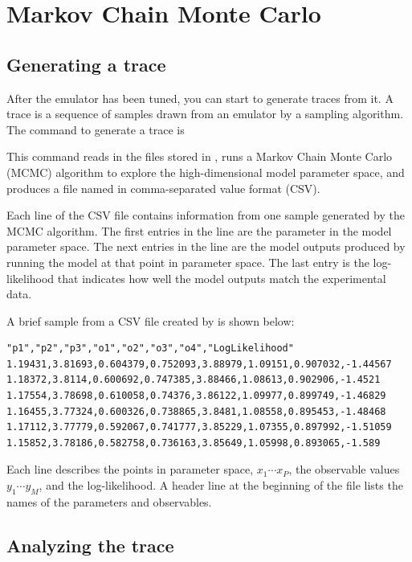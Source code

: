 \section{Markov Chain Monte Carlo}\label{sec:mcmc}

\subsection{Generating a trace}\label{subsec:GeneratingTheTrace}

After the emulator has been tuned, you can start to generate traces from it. A trace is a sequence of samples drawn from an emulator by a sampling algorithm. The command to generate a trace is


This command reads in the files stored in , runs a Markov Chain Monte Carlo (MCMC) algorithm to explore the high-dimensional model parameter space, and produces a file named  in comma-separated value format (CSV).

Each line of the CSV file contains information from one sample generated by the MCMC algorithm. The first entries in the line are the parameter in the model parameter space. The next entries in the line are the model outputs produced by running the model at that point in parameter space. The last entry is the log-likelihood that indicates how well the model outputs match the experimental data.

A brief sample from a CSV file created by   is shown below:

\begin{verbatim}
"p1","p2","p3","o1","o2","o3","o4","LogLikelihood"
1.19431,3.81693,0.604379,0.752093,3.88979,1.09151,0.907032,-1.44567
1.18372,3.8114,0.600692,0.747385,3.88466,1.08613,0.902906,-1.4521
1.17554,3.78698,0.610058,0.74376,3.86122,1.09977,0.899749,-1.46829
1.16455,3.77324,0.600326,0.738865,3.8481,1.08558,0.895453,-1.48468
1.17112,3.77779,0.592067,0.741777,3.85229,1.07355,0.897992,-1.51059
1.15852,3.78186,0.582758,0.736163,3.85649,1.05998,0.893065,-1.589
\end{verbatim}

Each line describes the points in parameter space, $x_1\cdots x_P$, the observable values $y_1\cdots y_M$, and the log-likelihood. A header line at the beginning of the file lists the names of the parameters and observables.

\subsection{Analyzing the trace}\label{subsec:AnalyzingTheTrace}

